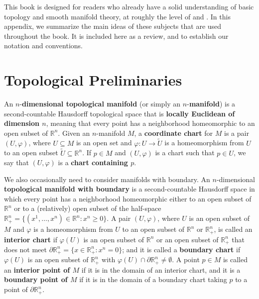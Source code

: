 
This book is designed for readers who already have a solid understanding of basic topology and smooth manifold theory, at roughly the level of \cite{LeeTM} and \cite{LeeSM}. In this appendix, we summarize the main ideas of these subjects that are used throughout the book. It is included here as a review, and to establish our notation and conventions.

\section{Topological Preliminaries}

An $n$-\textbf{dimensional topological manifold} (or simply an $n$-\textbf{manifold}) is a second-countable Hausdorff topological space that is \textbf{locally Euclidean of dimension $n$}, meaning that every point has a neighborhood homeomorphic to an open subset of $\mathbb{R}^n$. Given an $n$-manifold $M$, a \textbf{coordinate chart} for $M$ is a pair $(U,\varphi)$, where $U \subseteq M$ is an open set and $\varphi : U \to \tilde{U}$ is a homeomorphism from $U$ to an open subset $\tilde{U} \subseteq \mathbb{R}^n$. If $p \in M$ and $(U,\varphi)$ is a chart such that $p \in U$, we say that $(U,\varphi)$ is a \textbf{chart containing $p$}.

We also occasionally need to consider manifolds with boundary. An $n$-dimensional \textbf{topological manifold with boundary} is a second-countable Hausdorff space in which every point has a neighborhood homeomorphic either to an open subset of $\mathbb{R}^n$ or to a (relatively) open subset of the half-space $\mathbb{R}^n_+ = \{(x^1,\ldots,x^n) \in \mathbb{R}^n : x^n \geq 0\}$. A pair $(U,\varphi)$, where $U$ is an open subset of $M$ and $\varphi$ is a homeomorphism from $U$ to an open subset of $\mathbb{R}^n$ or $\mathbb{R}^n_+$, is called an \textbf{interior chart} if $\varphi(U)$ is an open subset of $\mathbb{R}^n$ or an open subset of $\mathbb{R}^n_+$ that does not meet $\partial \mathbb{R}^n_+ = \{x \in \mathbb{R}^n_+ : x^n = 0\}$; and it is called a \textbf{boundary chart} if $\varphi(U)$ is an open subset of $\mathbb{R}^n_+$ with $\varphi(U) \cap \partial \mathbb{R}^n_+ \neq \emptyset$. A point $p \in M$ is called an \textbf{interior point of $M$} if it is in the domain of an interior chart, and it is a \textbf{boundary point of $M$} if it is in the domain of a boundary chart taking $p$ to a point of $\partial \mathbb{R}^n_+$.

